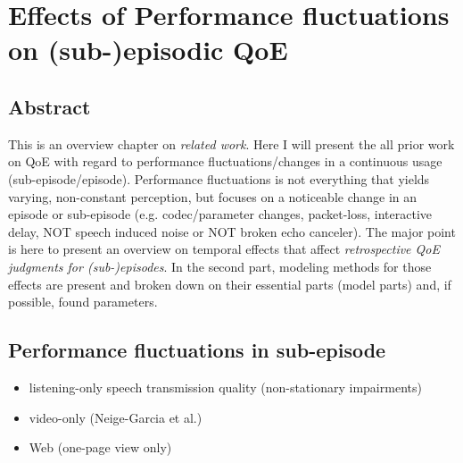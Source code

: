 \chapter{Effects of Performance fluctuations on (sub-)episodic QoE}\label{chap:04}
\section*{Abstract}
This is an overview chapter on \textit{related work}.
Here I will present the all prior work on QoE with regard to performance fluctuations/changes in a continuous usage (sub-episode/episode).
Performance fluctuations is not everything that yields varying, non-constant perception, but focuses on a noticeable change in an episode or sub-episode (e.g. codec/parameter changes, packet-loss, interactive delay, NOT speech induced noise or NOT broken echo canceler).
The major point is here to present an overview on temporal effects that affect \textit{retrospective QoE judgments for (sub-)episodes}.
In the second part, modeling methods for those effects are present and broken down on their essential parts (model parts) and, if possible, found parameters.







\section{Performance fluctuations in sub-episode}
\begin{itemize}
\item listening-only speech transmission quality (non-stationary impairments)
\item video-only (Neige-Garcia et al.)
\item Web (one-page view only)
\end{itemize}


